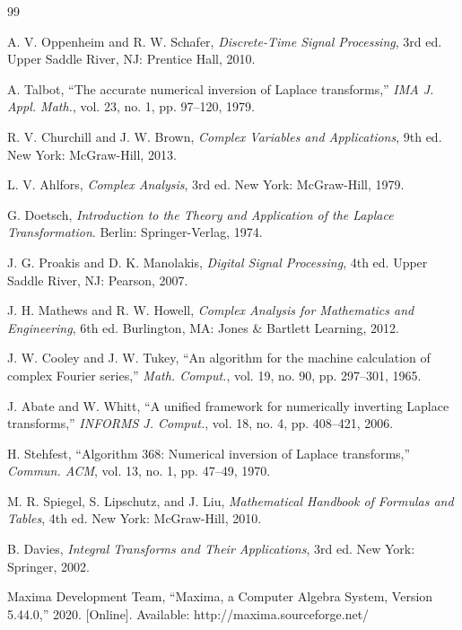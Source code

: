 \documentclass[conference]{IEEEtran}
\begin{document}
\begin{thebibliography}{99}

A. V. Oppenheim and R. W. Schafer, \textit{Discrete-Time Signal Processing}, 3rd ed. Upper Saddle River, NJ: Prentice Hall, 2010.

A. Talbot, ``The accurate numerical inversion of Laplace transforms,'' \textit{IMA J. Appl. Math.}, vol. 23, no. 1, pp. 97--120, 1979.

R. V. Churchill and J. W. Brown, \textit{Complex Variables and Applications}, 9th ed. New York: McGraw-Hill, 2013.

L. V. Ahlfors, \textit{Complex Analysis}, 3rd ed. New York: McGraw-Hill, 1979.

G. Doetsch, \textit{Introduction to the Theory and Application of the Laplace Transformation}. Berlin: Springer-Verlag, 1974.

J. G. Proakis and D. K. Manolakis, \textit{Digital Signal Processing}, 4th ed. Upper Saddle River, NJ: Pearson, 2007.

J. H. Mathews and R. W. Howell, \textit{Complex Analysis for Mathematics and Engineering}, 6th ed. Burlington, MA: Jones \& Bartlett Learning, 2012.

J. W. Cooley and J. W. Tukey, ``An algorithm for the machine calculation of complex Fourier series,'' \textit{Math. Comput.}, vol. 19, no. 90, pp. 297--301, 1965.

J. Abate and W. Whitt, ``A unified framework for numerically inverting Laplace transforms,'' \textit{INFORMS J. Comput.}, vol. 18, no. 4, pp. 408--421, 2006.

H. Stehfest, ``Algorithm 368: Numerical inversion of Laplace transforms,'' \textit{Commun. ACM}, vol. 13, no. 1, pp. 47--49, 1970.

M. R. Spiegel, S. Lipschutz, and J. Liu, \textit{Mathematical Handbook of Formulas and Tables}, 4th ed. New York: McGraw-Hill, 2010.

B. Davies, \textit{Integral Transforms and Their Applications}, 3rd ed. New York: Springer, 2002.

Maxima Development Team, ``Maxima, a Computer Algebra System, Version 5.44.0,'' 2020. [Online]. Available: http://maxima.sourceforge.net/


\end{thebibliography}
\end{document}

